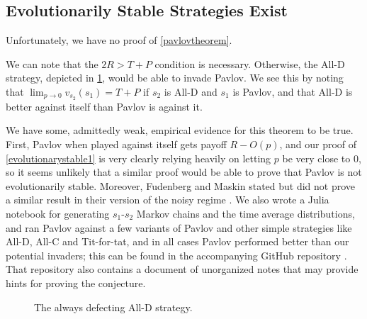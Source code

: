 \documentclass[12pt]{article}
\theoremstyle{definition}
\theoremstyle{remark}
\begin{document}



    \subsection{Evolutionarily Stable Strategies Exist}

    Unfortunately, we have no proof of \cref{pavlovtheorem}.

    We can note that the $2R > T + P$ condition is necessary. Otherwise, the All-D strategy, depicted in \cref{figurealld}, would be able to invade Pavlov. We see this by noting that $\lim_{p \to 0} v_{s_2}(s_1) = T + P$ if $s_2$ is All-D and $s_1$ is Pavlov, and that All-D is better against itself than Pavlov is against it.

    We have some, admittedly weak, empirical evidence for this theorem to be true. First, Pavlov when played against itself gets payoff $R - O(p)$, and our proof of \cref{evolutionarystable1} is very clearly relying heavily on letting $p$ be very close to 0, so it seems unlikely that a similar proof would be able to prove that Pavlov is not evolutionarily stable. Moreover, Fudenberg and Maskin stated but did not prove a similar result in their version of the noisy regime \cite{fundenberg1990evolution}. We also wrote a Julia notebook for generating $s_1$-$s_2$ Markov chains and the time average distributions, and ran Pavlov against a few variants of Pavlov and other simple strategies like All-D, All-C and Tit-for-tat, and in all cases Pavlov performed better than our potential invaders; this can be found in the accompanying GitHub repository \cite{arvid2020}. That repository also contains a document of unorganized notes that may provide hints for proving the conjecture.

\begin{figure}
  \centering
  \caption{The always defecting All-D strategy.}
  \label{figurealld}
\end{figure}
\end{document}
